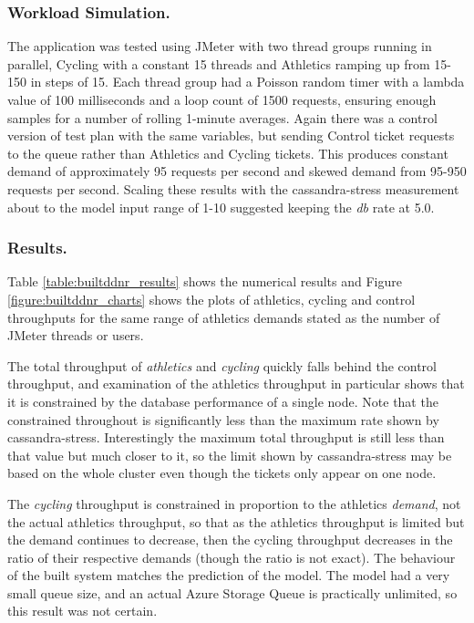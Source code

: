 \documentclass[runningheads]{llncs}
\begin{document}
\subsubsection{Workload Simulation.}  The application was tested using JMeter with two thread groups running in parallel, Cycling with a constant 15 threads and Athletics ramping up from 15-150 in steps of 15.  Each thread group had a Poisson random timer with a lambda value of 100 milliseconds and a loop count of 1500 requests, ensuring enough samples for a number of rolling 1-minute averages.  Again there was a control version of test plan with the same variables, but sending Control ticket requests to the queue rather than Athletics and Cycling tickets.  This produces constant demand of approximately 95 requests per second and skewed demand from 95-950 requests per second.  Scaling these results with the cassandra-stress measurement about to the model input range of 1-10 suggested keeping the {\itshape db} rate at 5.0.

\subsubsection{Results.} 
Table \ref{table:builtddnr_results} shows the numerical results and Figure \ref{figure:builtddnr_charts} shows the plots of athletics, cycling and control throughputs for the same range of athletics demands stated as the number of JMeter threads or users.

The total throughput of {\itshape athletics} and {\itshape cycling} quickly falls behind the control throughput, and examination of the athletics throughput in particular shows that it is constrained by the database performance of a single node.  Note that the constrained throughout is significantly less than the maximum rate shown by cassandra-stress.  Interestingly the maximum total throughput is still less than that value but much closer to it, so the limit shown by cassandra-stress may be based on the whole cluster even though the tickets only appear on one node.

The {\itshape cycling} throughput is constrained in proportion to the athletics {\itshape demand}, not the actual athletics throughput, so that as the athletics throughput is limited but the demand continues to decrease, then the cycling throughput decreases in the ratio of their respective demands (though the ratio is not exact).  The behaviour of the built system matches the prediction of the model.  The model had a very small queue size, and an actual Azure Storage Queue is practically unlimited, so this result was not certain.
\end{document}
